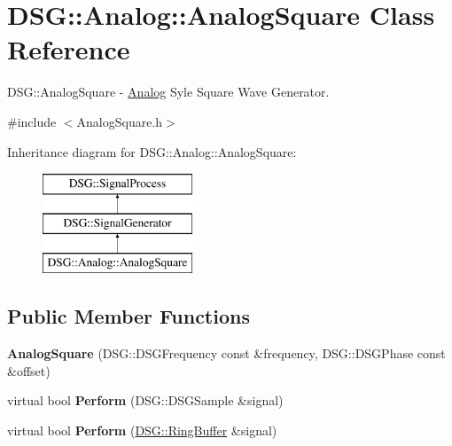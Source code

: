 \hypertarget{class_d_s_g_1_1_analog_1_1_analog_square}{\section{D\+S\+G\+:\+:Analog\+:\+:Analog\+Square Class Reference}
\label{class_d_s_g_1_1_analog_1_1_analog_square}
}


D\+S\+G\+::\+Analog\+Square -\/ \hyperlink{namespace_d_s_g_1_1_analog}{Analog} Syle Square Wave Generator.  




{\ttfamily \#include $<$Analog\+Square.\+h$>$}

Inheritance diagram for D\+S\+G\+:\+:Analog\+:\+:Analog\+Square\+:\begin{figure}[H]
\begin{center}
\leavevmode
\includegraphics[height=3.000000cm]{class_d_s_g_1_1_analog_1_1_analog_square}
\end{center}
\end{figure}
\subsection*{Public Member Functions}
\begin{DoxyCompactItemize}
\item 
\hypertarget{class_d_s_g_1_1_analog_1_1_analog_square_a886eb67edded43efca895741559a55f4}{{\bfseries Analog\+Square} (D\+S\+G\+::\+D\+S\+G\+Frequency const \&frequency, D\+S\+G\+::\+D\+S\+G\+Phase const \&offset)}\label{class_d_s_g_1_1_analog_1_1_analog_square_a886eb67edded43efca895741559a55f4}

\item 
\hypertarget{class_d_s_g_1_1_analog_1_1_analog_square_a784aa17d266704647789b972cf880e9f}{virtual bool {\bfseries Perform} (D\+S\+G\+::\+D\+S\+G\+Sample \&signal)}\label{class_d_s_g_1_1_analog_1_1_analog_square_a784aa17d266704647789b972cf880e9f}

\item 
\hypertarget{class_d_s_g_1_1_analog_1_1_analog_square_af4d41d5894ae02e920c61e06cf041c60}{virtual bool {\bfseries Perform} (\hyperlink{class_d_s_g_1_1_ring_buffer}{D\+S\+G\+::\+Ring\+Buffer} \&signal)}\label{class_d_s_g_1_1_analog_1_1_analog_square_af4d41d5894ae02e920c61e06cf041c60}

\end{DoxyCompactItemize}
